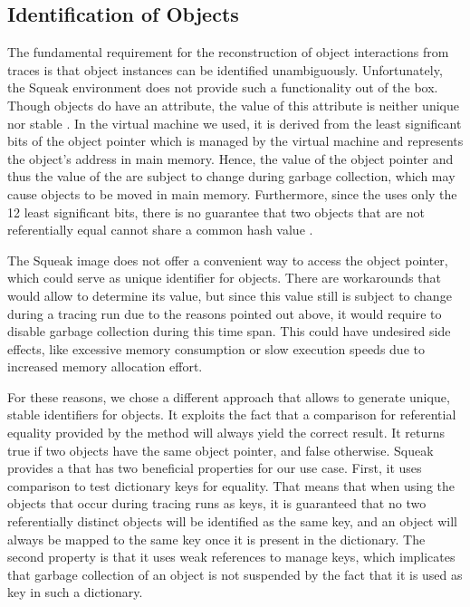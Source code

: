 \subsection{Identification of Objects}
\label{ss:ImplementationTracingIdentification}
The fundamental requirement for the reconstruction of object interactions from traces is that object instances can be identified unambiguously.
Unfortunately, the Squeak environment does not provide such a functionality out of the box.
Though objects do have an  attribute, the value of this attribute is neither unique nor stable \cite{goldberg_smalltalk-80:_1983}.
In the virtual machine we used, it is derived from the least significant bits of the object pointer which is managed by the virtual machine and represents the object's address in main memory.
Hence, the value of the object pointer and thus the value of the  are subject to change during garbage collection, which may cause objects to be moved in main memory.
Furthermore, since the  uses only the 12 least significant bits, there is no guarantee that two objects that are not referentially equal cannot share a common hash value \cite{goldberg_smalltalk-80:_1983}.

The Squeak image does not offer a convenient way to access the object pointer, which could serve as unique identifier for objects.
There are workarounds that would allow to determine its value, but since this value still is subject to change during a tracing run due to the reasons pointed out above, it would require to disable garbage collection during this time span.
This could have undesired side effects, like excessive memory consumption or slow execution speeds due to increased memory allocation effort.

For these reasons, we chose a different approach that allows to generate unique, stable identifiers for objects.
It exploits the fact that a comparison for referential equality provided by the \inlinecode{==} method will always yield the correct result.
It returns true if two objects have the same object pointer, and false otherwise.
Squeak provides a  that has two beneficial properties for our use case.
First, it uses \inlinecode{==} comparison to test dictionary keys for equality.
That means that when using the objects that occur during tracing runs as keys, it is guaranteed that no two referentially distinct objects will be identified as the same key, and an object will always be mapped to the same key once it is present in the dictionary.
The second property is that it uses weak references to manage keys, which implicates that garbage collection of an object is not suspended by the fact that it is used as key in such a dictionary.

